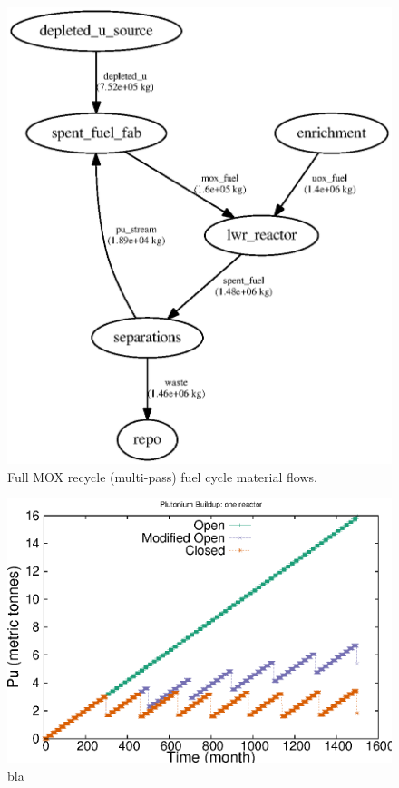 \begin{figure}
\label{fig:flow-closed}
\caption{Full MOX recycle (multi-pass) fuel cycle material flows.}
\begin{center}
\includegraphics{./images/flow-closed-1.eps}
\end{center}
\end{figure}


\begin{figure}
\label{fig:puseries-1}
\caption{bla}
\begin{center}
\includegraphics{./images/puseries-1.eps}
\end{center}
\end{figure}

